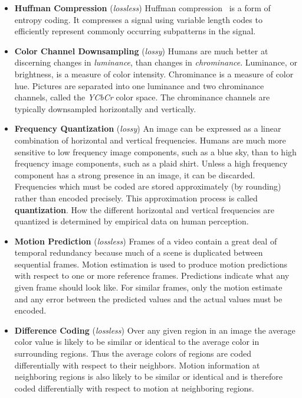\begin{itemize}
  \item \textbf{Huffman Compression} (\textit{lossless}) 
Huffman compression~\cite{Huffman52} is a form of entropy 
coding. It compresses a signal using variable length codes to efficiently 
represent commonly occurring subpatterns in the signal.
  \item \textbf{Color Channel Downsampling} (\textit{lossy})  
Humans are much better at discerning changes in {\it luminance}, 
than changes in {\it chrominance}. Luminance, or brightness, is a 
measure of color intensity. Chrominance is a measure of color hue.
Pictures are separated into one luminance and two chrominance channels, 
called the \textit{YCbCr} color space. The chrominance channels are
typically downsampled horizontally and vertically. 
  \item \textbf{Frequency Quantization} (\textit{lossy}) 
An image can be expressed as a linear combination of 
horizontal and vertical frequencies.
Humans are much more sensitive
to low frequency image components, such as a blue sky, than to high frequency image components,
such as a plaid shirt. Unless a high frequency component has 
a strong presence in an image, it can be discarded.
Frequencies which must be coded are stored 
approximately (by rounding) rather
than encoded precisely. This approximation process is called
\textbf{quantization}. How the different horizontal and vertical
frequencies are quantized is determined by empirical data
on human perception.
  \item \textbf{Motion Prediction} (\textit{lossless}) 
Frames of a video
contain a great deal of temporal redundancy because much of a
scene is duplicated between sequential frames. Motion estimation is used to
produce motion predictions with respect to one or more reference frames.
Predictions indicate what any given frame should look like. For similar frames, 
only the motion estimate and any error between the predicted values and the
actual values must be encoded.
  \item \textbf{Difference Coding} (\textit{lossless})  
Over any given region in an image the average color value is likely to be
similar or identical to the average color in surrounding regions.
Thus the average colors of regions are coded differentially with respect
to their neighbors. Motion information at neighboring regions is also likely
to be similar or identical and is therefore coded 
differentially with respect to motion at neighboring regions.
\end{itemize}

